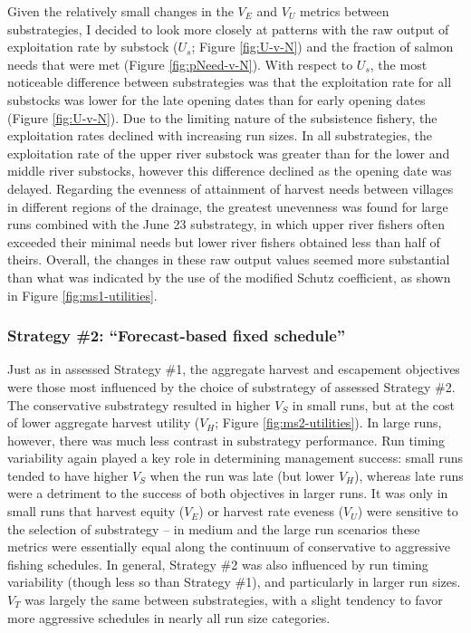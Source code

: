 \documentclass[12pt,]{book}
\theoremstyle{definition}
\theoremstyle{definition}
\theoremstyle{definition}
\theoremstyle{remark}
\begin{document}
Given the relatively small changes in the \(V_E\) and \(V_U\) metrics
between substrategies, I decided to look more closely at patterns with
the raw output of exploitation rate by substock (\(U_s\); Figure
\ref{fig:U-v-N}) and the fraction of salmon needs that were met (Figure
\ref{fig:pNeed-v-N}). With respect to \(U_s\), the most noticeable
difference between substrategies was that the exploitation rate for all
substocks was lower for the late opening dates than for early opening
dates (Figure \ref{fig:U-v-N}). Due to the limiting nature of the
subsistence fishery, the exploitation rates declined with increasing run
sizes. In all substrategies, the exploitation rate of the upper river
substock was greater than for the lower and middle river substocks,
however this difference declined as the opening date was delayed.
Regarding the evenness of attainment of harvest needs between villages
in different regions of the drainage, the greatest unevenness was found
for large runs combined with the June 23 substrategy, in which upper
river fishers often exceeded their minimal needs but lower river fishers
obtained less than half of theirs. Overall, the changes in these raw
output values seemed more substantial than what was indicated by the use
of the modified Schutz coefficient, as shown in Figure
\ref{fig:ms1-utilities}.

\subsubsection{\texorpdfstring{Strategy \#2: ``Forecast-based fixed
schedule''}{Strategy \#2: Forecast-based fixed schedule}}\label{strategy-2-forecast-based-fixed-schedule-1}

\noindent
Just as in assessed Strategy \#1, the aggregate harvest and escapement
objectives were those most influenced by the choice of substrategy of
assessed Strategy \#2. The conservative substrategy resulted in higher
\(V_S\) in small runs, but at the cost of lower aggregate harvest
utility (\(V_H\); Figure \ref{fig:ms2-utilities}). In large runs,
however, there was much less contrast in substrategy performance. Run
timing variability again played a key role in determining management
success: small runs tended to have higher \(V_S\) when the run was late
(but lower \(V_H\)), whereas late runs were a detriment to the success
of both objectives in larger runs. It was only in small runs that
harvest equity (\(V_E\)) or harvest rate eveness (\(V_U\)) were
sensitive to the selection of substrategy -- in medium and the large run
scenarios these metrics were essentially equal along the continuum of
conservative to aggressive fishing schedules. In general, Strategy \#2
was also influenced by run timing variability (though less so than
Strategy \#1), and particularly in larger run sizes. \(V_T\) was largely
the same between substrategies, with a slight tendency to favor more
aggressive schedules in nearly all run size categories.
\end{document}
